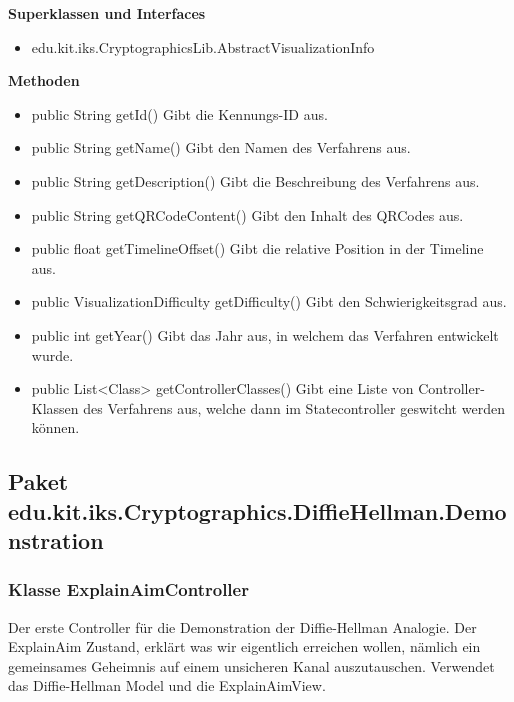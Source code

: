 \documentclass{article}
\begin{document}
      \textbf{Superklassen und Interfaces}
      \begin{itemize}
        \item edu.kit.iks.CryptographicsLib.AbstractVisualizationInfo
      \end{itemize}
      
      \textbf{Methoden}
      \begin{itemize}
        \item public String getId() \newline
        Gibt die Kennungs-ID aus.
        \item public String getName() \newline
        Gibt den Namen des Verfahrens aus.
        \item public String getDescription() \newline
        Gibt die Beschreibung des Verfahrens aus.
        \item public String getQRCodeContent() \newline
        Gibt den Inhalt des QRCodes aus.
        \item public float getTimelineOffset() \newline
        Gibt die relative Position in der Timeline aus.
        \item public VisualizationDifficulty getDifficulty() \newline
        Gibt den Schwierigkeitsgrad aus.
        \item public int getYear() \newline
        Gibt das Jahr aus, in welchem das Verfahren entwickelt wurde.
        \item public List<Class> getControllerClasses() \newline
        Gibt eine Liste von Controller-Klassen des Verfahrens aus, welche dann im Statecontroller geswitcht werden können.
      \end{itemize}

\subsection{Paket edu.kit.iks.Cryptographics.DiffieHellman.Demonstration}

\subsubsection{Klasse ExplainAimController}
      Der erste Controller für die Demonstration der Diffie-Hellman Analogie.
      Der ExplainAim Zustand, erklärt was wir eigentlich erreichen wollen,
      nämlich ein gemeinsames Geheimnis auf einem unsicheren Kanal auszutauschen.
      Verwendet das Diffie-Hellman Model und die ExplainAimView.
\end{document}
